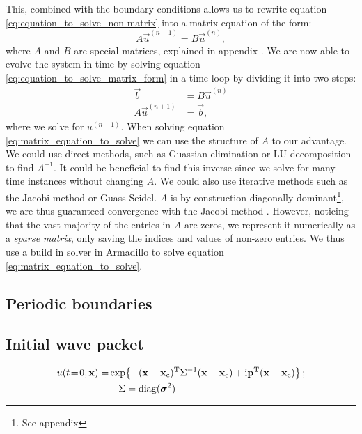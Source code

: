         This, combined with the boundary conditions allows us to rewrite equation \eqref{eq:equation_to_solve_non-matrix} into a matrix equation of the form:
        \begin{equation}\label{eq:equation_to_solve_matrix_form}
            A\vec{u}^{(n+1)} = B\vec{u}^{(n)},
        \end{equation}
        where $A$ and $B$ are special matrices, explained in appendix . 
        We are now able to evolve the system in time by solving equation \eqref{eq:equation_to_solve_matrix_form} in a time loop by dividing it into two steps:
        \begin{equation}\label{eq:matrix_equation_to_solve}
            \begin{split}
                \vec{b} &= B\vec{u}^{(n)} \\
                A\vec{u}^{(n+1)} &= \vec{b},
            \end{split}
        \end{equation}
        where we solve for $u^{(n+1)}$. When solving equation \eqref{eq:matrix_equation_to_solve} we can use the structure of $A$ to our advantage. We could use direct methods, such as Guassian elimination or LU-decomposition to find $A^{-1}$. It could be beneficial to find this inverse since we solve for many time instances without changing $A$. We could also use iterative methods such as the Jacobi method or Guass-Seidel. $A$ is by construction diagonally dominant\footnote{See appendix }, we are thus guaranteed convergence with the Jacobi method . However, noticing that the vast majority of the entries in $A$ are zeros, we represent it numerically as a \textit{sparse matrix}, only saving the indices and values of non-zero entries. We thus use a build in solver in Armadillo to solve equation \eqref{eq:matrix_equation_to_solve}.

\subsection{Periodic boundaries}\label{sec:method:periodic_boundaries}

\subsection{Initial wave packet}\label{sec:method:initial_wave}


    \begin{equation}\label{eq:p4_initial_condition}
    \begin{split}
        u(t\!=\!0, \mathbf{x}) = & \exp{-(\mathbf{x}-\mathbf{x}_\mathrm{c})^\mathrm{T}\Sigma^{-1}(\mathbf{x}-\mathbf{x}_\mathrm{c}) + \mathrm{i}\mathbf{p}^\mathrm{T}(\mathbf{x}-\mathbf{x}_\mathrm{c})} \,;  \\ 
        &\quad\Sigma = \mathrm{diag}(\boldsymbol{\sigma}^2) 
    \end{split}
    \end{equation}

